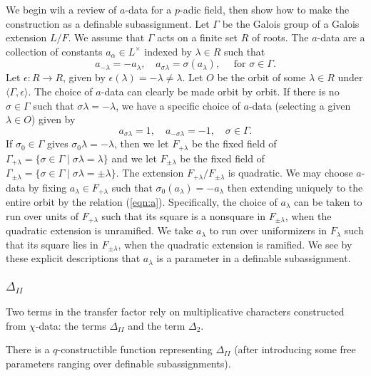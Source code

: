 We begin wih a review of $a$-data for a $p$-adic field, then show how
to make the construction as a definable subassignment.  Let $\Gamma$
be the Galois group of a Galois extension $L/F$.  We assume that
$\Gamma$ acts on a finite set $R$ of roots.  The $a$-data are a
collection of constants $a_\alpha\in L^\times$ indexed by $\lambda\in
R$ such that
\begin{equation}\label{eqn:a}
a_{-\lambda} = -a_\lambda,\quad a_{\sigma\lambda} 
= \sigma(a_\lambda),\quad \text{ for } \sigma\in \Gamma.
\end{equation}
Let $\epsilon:R\to R$, given by
$\epsilon(\lambda)=-\lambda\ne\lambda$.  Let $O$ be the orbit of some
$\lambda\in R$ under $\langle\Gamma,\epsilon\rangle$.  The choice of
$a$-data can clearly be made orbit by orbit.  If there is no
$\sigma\in \Gamma$ such that $\sigma\lambda=-\lambda$, we have a
specific choice of $a$-data (selecting a given $\lambda\in O$) given
by
\[
a_{\sigma\lambda}=1,
\quad a_{-\sigma\lambda}=-1,\quad \sigma\in\Gamma.
\]
If $\sigma_0\in\Gamma$ gives $\sigma_0\lambda=-\lambda$, then we let
$F_{+\lambda}$ be the fixed field of $\Gamma_{+\lambda} =
\{\sigma\in\Gamma\mid \sigma\lambda=\lambda\}$ and we let
$F_{\pm\lambda}$ be the fixed field of $\Gamma_{\pm\lambda} =
\{\sigma\in\Gamma\mid \sigma\lambda=\pm\lambda\}$.  The extension
$F_{+\lambda}/F_{\pm\lambda}$ is quadratic.  We may choose $a$-data by
fixing $a_\lambda\in F_{+\lambda}$ such that $\sigma_0(a_\lambda) =
-a_\lambda$ then extending uniquely to the entire orbit by the
relation (\ref{eqn:a}).  Specifically, the choice of $a_\lambda$ can
be taken to run over units of $F_{+\lambda}$ such that its square is a
nonsquare in $F_{\pm\lambda}$, when the quadratic extension is
unramified.  We take $a_\lambda$ to run over uniformizers in
$F_{\lambda}$ such that its square lies in $F_{\pm\lambda}$, when the
quadratic extension is ramified.  We see by these explicit
descriptions that $a_\lambda$ is a parameter in a definable
subassignment.

\subsubsection{$\Delta_{II}$}
Two terms in the transfer factor rely on multiplicative characters
constructed from $\chi$-data: the terms $\Delta_{II}$ and the term
$\Delta_2$.

\begin{lemma}  
  There is a $q$-constructible function representing $\Delta_{II}$
  (after introducing some free parameters ranging over definable
  subassignments).
\end{lemma}

